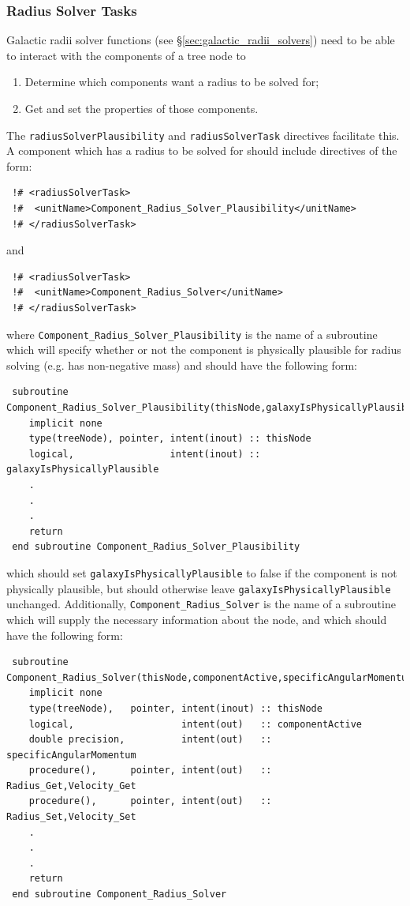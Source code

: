 \subsubsection{Radius Solver Tasks}\label{sec:radius_solver}

Galactic radii solver functions (see \S\ref{sec:galactic_radii_solvers}) need to be able to interact with the components of a tree node to
\begin{enumerate}
 \item Determine which components want a radius to be solved for;
 \item Get and set the properties of those components.
\end{enumerate}
The  {\tt radiusSolverPlausibility} and {\tt radiusSolverTask} directives facilitate this. A component which has a radius to be solved for should include directives of the form:
\begin{verbatim}
 !# <radiusSolverTask>
 !#  <unitName>Component_Radius_Solver_Plausibility</unitName>
 !# </radiusSolverTask>
\end{verbatim}
and
\begin{verbatim}
 !# <radiusSolverTask>
 !#  <unitName>Component_Radius_Solver</unitName>
 !# </radiusSolverTask>
\end{verbatim}
where {\tt Component\_Radius\_Solver\_Plausibility} is the name of a subroutine which will specify whether or not the component is physically plausible for radius solving (e.g. has non-negative mass) and should have the following form:
\begin{verbatim}
 subroutine Component_Radius_Solver_Plausibility(thisNode,galaxyIsPhysicallyPlausible)
    implicit none
    type(treeNode), pointer, intent(inout) :: thisNode
    logical,                 intent(inout) :: galaxyIsPhysicallyPlausible
    .
    .
    .
    return
 end subroutine Component_Radius_Solver_Plausibility
\end{verbatim}
which should set {\tt galaxyIsPhysicallyPlausible} to false if the component is not physically plausible, but should otherwise leave {\tt galaxyIsPhysicallyPlausible} unchanged. Additionally, {\tt Component\_Radius\_Solver} is the name of a subroutine which will supply the necessary information about the node, and which should have the following form:
\begin{verbatim}
 subroutine Component_Radius_Solver(thisNode,componentActive,specificAngularMomentum,Radius_Get,Radius_Set,Velocity_Get,Velocity_Set)
    implicit none
    type(treeNode),   pointer, intent(inout) :: thisNode
    logical,                   intent(out)   :: componentActive
    double precision,          intent(out)   :: specificAngularMomentum
    procedure(),      pointer, intent(out)   :: Radius_Get,Velocity_Get
    procedure(),      pointer, intent(out)   :: Radius_Set,Velocity_Set
    .
    .
    .
    return
 end subroutine Component_Radius_Solver
\end{verbatim}
